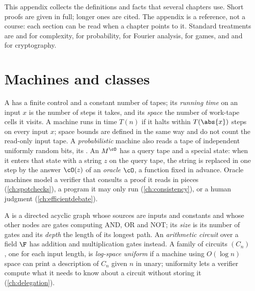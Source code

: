 \begin{refsection}

This appendix collects the definitions and facts that several chapters use. Short proofs are given in full; longer ones are cited. The appendix is a reference, not a course: each section can be read when a chapter points to it. Standard treatments are \textcite{AroraBarak2009} and \textcite{Goldreich2008} for complexity, \textcite{MitzenmacherUpfal2017} for probability, \textcite{ODonnell2014} for Fourier analysis, \textcite{OsborneRubinstein1994} for games, and \textcite{Goldreich2001} and \textcite{KatzLindell2020} for cryptography.

\section{Machines and classes}\label{sec:toolkit:machines}

A  has a finite control and a constant number of tapes; its \emph{running time} on an input $x$ is the number of steps it takes, and its \emph{space} the number of work-tape cells it visits. A machine runs in time $T(n)$ if it halts within $T(\abs{x})$ steps on every input $x$; space bounds are defined in the same way and do not count the read-only input tape. A \emph{probabilistic} machine also reads a tape of independent uniformly random bits, its . An  $M^{\cO}$ has a query tape and a special state: when it enters that state with a string $z$ on the query tape, the string is replaced in one step by the answer $\cO(z)$ of an \emph{oracle} $\cO$, a function fixed in advance. Oracle machines model a verifier that consults a proof it reads in pieces (\cref{ch:spotchecks}), a program it may only run (\cref{ch:consistency}), or a human judgment (\cref{ch:efficientdebate}).

A  is a directed acyclic graph whose sources are inputs and constants and whose other nodes are gates computing AND, OR and NOT; its \emph{size} is its number of gates and its \emph{depth} the length of its longest path. An \emph{arithmetic circuit} over a field $\F$ has addition and multiplication gates instead. A family of circuits $(C_n)$, one for each input length, is \emph{log-space uniform} if a machine using $O(\log n)$ space can print a description of $C_n$ given $n$ in unary; uniformity lets a verifier compute what it needs to know about a circuit without storing it (\cref{ch:delegation}).


\end{refsection}
